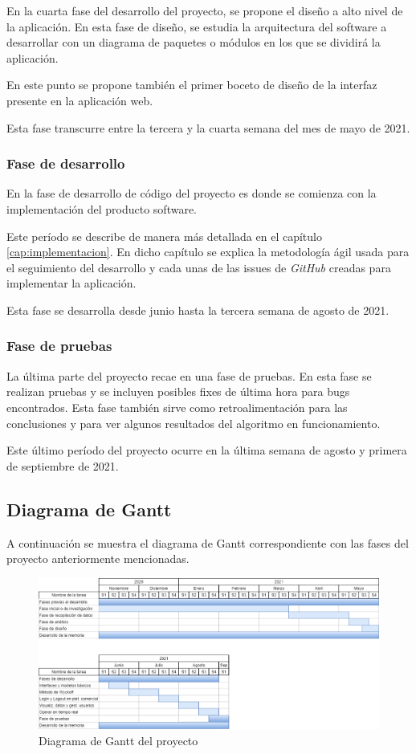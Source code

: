 En la cuarta fase del desarrollo del proyecto, se propone el diseño a alto nivel de la aplicación. En esta fase de diseño, se estudia la arquitectura del software a desarrollar con un diagrama de paquetes o módulos en los que se dividirá la aplicación. \newline

En este punto se propone también el primer boceto de diseño de la interfaz presente en la aplicación web. \newline

Esta fase transcurre entre la tercera y la cuarta semana del mes de mayo de 2021.

\subsubsection{Fase de desarrollo}

En la fase de desarrollo de código del proyecto es donde se comienza con la implementación del producto software. \newline

Este período se describe de manera más detallada en el capítulo \ref{cap:implementacion}. En dicho capítulo se explica la metodología ágil usada para el seguimiento del desarrollo y cada unas de las issues de \textit{GitHub} creadas para implementar la aplicación. \newline

Esta fase se desarrolla desde junio hasta la tercera semana de agosto de 2021.

\subsubsection{Fase de pruebas}

La última parte del proyecto recae en una fase de pruebas. En esta fase se realizan pruebas y se incluyen posibles fixes de última hora para bugs encontrados. Esta fase también sirve como retroalimentación para las conclusiones y para ver algunos resultados del algoritmo en funcionamiento. \newline


Este último período del proyecto ocurre en la última semana de agosto y primera de septiembre de 2021.

\subsection{Diagrama de Gantt}

A continuación se muestra el diagrama de Gantt correspondiente con las fases del proyecto anteriormente mencionadas. \newline

\begin{figure}[h]
	\includegraphics[width=1.2\textwidth]{imagenes/gantt.png}
	\caption{Diagrama de Gantt del proyecto}
\end{figure}






